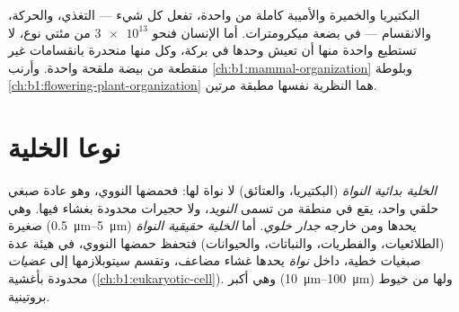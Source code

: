 \begin{example}\label{ex:b1:cell-unit-of-life:onemany}
البكتيريا والخميرة والأميبة  كاملة من  واحدة، تفعل كل شيء
--- التغذي، والحركة، والانقسام --- في بضعة ميكرومترات. أما الإنسان
فنحو $\num{3e13}$  من مئتي نوع، لا تستطيع واحدة منها أن تعيش
وحدها في بركة، وكل منها منحدرة بانقسامات غير منقطعة من بيضة ملقحة
واحدة. وأرنب \cref{ch:b1:mammal-organization} وبلوطة
\cref{ch:b1:flowering-plant-organization} هما النظرية نفسها مطبقة
مرتين.
\end{example}

\section{نوعا الخلية}

\begin{definition}\label{def:b1:cell-unit-of-life:prokeuk}
\emph{الخلية بدائية النواة} (البكتيريا،
والعتائق) لا نواة لها: فحمضها النووي، وهو عادة صبغي حلقي واحد، يقع
في منطقة من  تسمى \emph{النويد}، ولا حجيرات
محدودة بغشاء فيها. وهي صغيرة (\qtyrange{0.5}{5}{\micro m}) يحدها
 ومن خارجه \emph{جدار خلوي}. أما
\emph{الخلية حقيقية النواة} (الطلائعيات،
والفطريات، والنباتات، والحيوانات) فتحفظ حمضها النووي، في هيئة عدة
صبغيات خطية، داخل \emph{نواة} يحدها غشاء مضاعف، وتقسم
سيتوبلازمها إلى \emph{عضيات} محدودة بأغشية
(\cref{ch:b1:eukaryotic-cell}). وهي أكبر
(\qtyrange{10}{100}{\micro m}) ولها  من خيوط بروتينية.
\end{definition}

